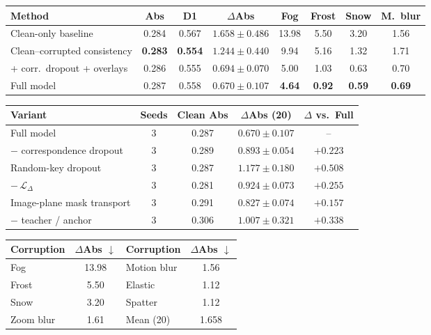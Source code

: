 \begin{tabular}{lccccccc}
\toprule
Method & Abs & D1 & $\Delta$Abs & Fog & Frost & Snow & M.\ blur \\
\midrule
Clean-only baseline & 0.284 & 0.567 & $1.658\pm0.486$ & 13.98 & 5.50 & 3.20 & 1.56 \\
Clean--corrupted consistency & \textbf{0.283} & \textbf{0.554} & $1.244\pm0.440$ & 9.94 & 5.16 & 1.32 & 1.71 \\
+ corr.\ dropout + overlays & 0.286 & 0.555 & $0.694\pm0.070$ & 5.00 & 1.03 & 0.63 & 0.70 \\
Full model & 0.287 & 0.558 & $\mathbf{0.670\pm0.107}$ & \textbf{4.64} & \textbf{0.92} & \textbf{0.59} & \textbf{0.69} \\
\bottomrule
\end{tabular}

\begin{tabular}{lcccc}
\toprule
Variant & Seeds & Clean Abs & $\Delta$Abs (20) & $\Delta$ vs.\ Full \\
\midrule
Full model & 3 & 0.287 & $0.670\pm0.107$ & -- \\
$-$ correspondence dropout & 3 & 0.289 & $0.893\pm0.054$ & $+0.223$ \\
Random-key dropout & 3 & 0.287 & $1.177\pm0.180$ & $+0.508$ \\
$-\,\mathcal{L}_\Delta$ & 3 & 0.281 & $0.924\pm0.073$ & $+0.255$ \\
Image-plane mask transport & 3 & 0.291 & $0.827\pm0.074$ & $+0.157$ \\
$-$ teacher / anchor & 3 & 0.306 & $1.007\pm0.321$ & $+0.338$ \\
\bottomrule
\end{tabular}

\begin{tabular}{lc@{\qquad}lc}
\toprule
Corruption & $\Delta$Abs $\downarrow$ & Corruption & $\Delta$Abs $\downarrow$ \\
\midrule
Fog & 13.98 & Motion blur & 1.56 \\
Frost & 5.50 & Elastic & 1.12 \\
Snow & 3.20 & Spatter & 1.12 \\
Zoom blur & 1.61 & Mean (20) & 1.658 \\
\bottomrule
\end{tabular}

